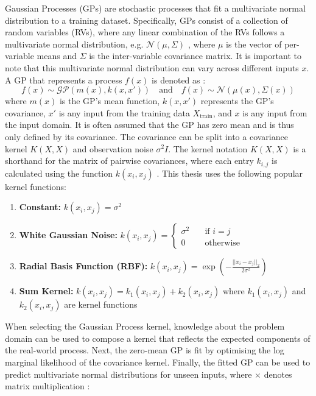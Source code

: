 Gaussian Processes (GPs) are stochastic processes that fit a multivariate normal distribution to a training dataset. Specifically, GPs consist of a collection of random variables (RVs), where any linear combination of the RVs follows a multivariate normal distribution, e.g. $\mathcal{N}(\mu, \Sigma)$ \cite{gp-ml-2005}, where $\mu$ is the vector of per-variable means and $\Sigma$ is the inter-variable covariance matrix. It is important to note that this multivariate normal distribution can vary across different inputs $x$. A GP that represents a process $f(x)$ is denoted as \cite{gp-ml-2005}:
\begin{equation*}
    f(x) \sim \mathcal{GP}(m(x), k(x, x')) \quad \text{and} \quad f(x) \sim \mathcal{N}(\mu(x), \Sigma(x))
\end{equation*}
where $m(x)$ is the GP's mean function, $k(x, x')$ represents the GP's covariance, $x'$ is any input from the training data $X_{\text{train}}$, and $x$ is any input from the input domain. It is often assumed that the GP has zero mean and is thus only defined by its covariance. The covariance can be split into a covariance kernel $K(X, X)$ and observation noise $\sigma^2 I$. The kernel notation $K(X, X)$ is a shorthand for the matrix of pairwise covariances, where each entry $k_{i,j}$ is calculated using the function $k(x_i, x_j)$ \cite{rio-2019}. This thesis uses the following popular kernel functions:
\begin{enumerate}
    \item \textbf{Constant:} $k(x_i, x_j) = \sigma^2$
    \item \textbf{White Gaussian Noise:} $k(x_i, x_j) = \begin{cases}
        \sigma^2 &\quad \text{if } i = j \\
        0 &\quad \text{otherwise}
    \end{cases}$
    \item \textbf{Radial Basis Function (RBF):} $k(x_i, x_j) = \exp{\left( -\frac{||x_i - x_j||_2}{2 \sigma^2} \right)}$
    \item \textbf{Sum Kernel:} $k(x_i, x_j) = k_1(x_i, x_j) + k_2(x_i, x_j)$ where $k_1(x_i, x_j)$ and $k_2(x_i, x_j)$ are kernel functions
\end{enumerate}
\noindent When selecting the Gaussian Process kernel, knowledge about the problem domain can be used to compose a kernel that reflects the expected components of the real-world process. Next, the zero-mean GP is fit by optimising the log marginal likelihood of the covariance kernel. Finally, the fitted GP can be used to predict multivariate normal distributions for unseen inputs, where $\times$ denotes matrix multiplication \cite{gp-ml-2005}:
